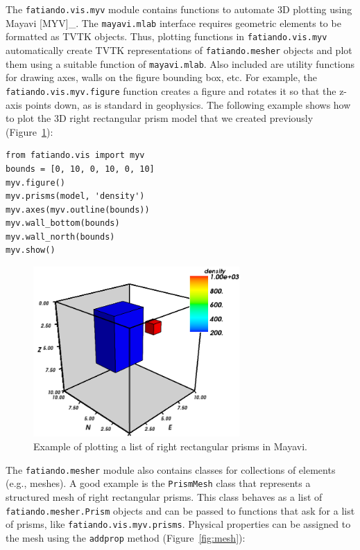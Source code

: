 The \texttt{fatiando.vis.myv} module contains functions to automate 3D plotting
using Mayavi {[}MYV{]}\_. The \texttt{mayavi.mlab} interface requires geometric
elements to be formatted as TVTK objects. Thus, plotting functions in
\texttt{fatiando.vis.myv} automatically create TVTK representations of
\texttt{fatiando.mesher} objects and plot them using a suitable function of
\texttt{mayavi.mlab}. Also included are utility functions for drawing axes,
walls on the figure bounding box, etc. For example, the
\texttt{fatiando.vis.myv.figure} function creates a figure and rotates it so
that the z-axis points down, as is standard in geophysics. The following
example shows how to plot the 3D right rectangular prism model that we created
previously (Figure~\ref{fig:twoprisms}):

\begin{verbatim}
from fatiando.vis import myv
bounds = [0, 10, 0, 10, 0, 10]
myv.figure()
myv.prisms(model, 'density')
myv.axes(myv.outline(bounds))
myv.wall_bottom(bounds)
myv.wall_north(bounds)
myv.show()
\end{verbatim}

\begin{figure}
    \centering
    \includegraphics[width=0.7\textwidth]{figures/paper1/meshes_3dplotting_2prisms}
    \caption{
        Example of plotting a list of right rectangular prisms in Mayavi.
    }
    \label{fig:twoprisms}
\end{figure}

The \texttt{fatiando.mesher} module also contains classes for
collections of elements (e.g., meshes). A good example is the
\texttt{PrismMesh} class that represents a structured mesh of right
rectangular prisms. This class behaves as a list of
\texttt{fatiando.mesher.Prism} objects and can be passed to functions
that ask for a list of prisms, like \texttt{fatiando.vis.myv.prisms}.
Physical properties can be assigned to the mesh using the
\texttt{addprop} method (Figure~\ref{fig:mesh}):

